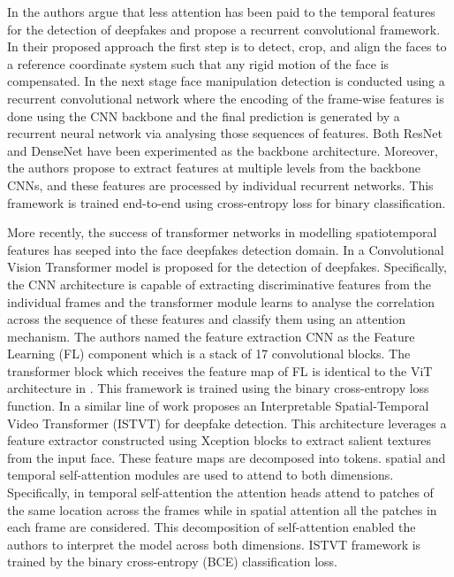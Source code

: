 In \cite{sabir2019recurrent} the authors argue that less attention has been paid to the temporal features for the detection of deepfakes and propose a recurrent convolutional framework. In their proposed approach the first step is to detect, crop, and align the faces to a reference coordinate system such that any rigid motion of the face is compensated. In the next stage face manipulation detection is conducted using a recurrent convolutional network where the encoding of the frame-wise features is done using the CNN backbone and the final prediction is generated by a recurrent neural network via analysing those sequences of features. Both ResNet and DenseNet have been experimented as the backbone architecture. Moreover, the authors propose to extract features at multiple levels from the backbone CNNs, and these features are processed by individual recurrent networks. This framework is trained end-to-end using cross-entropy loss for binary classification. 

More recently, the success of transformer networks in modelling spatiotemporal features has seeped into the face deepfakes detection domain. In \cite{wodajo2021deepfake} a Convolutional Vision Transformer model is proposed for the detection of deepfakes. Specifically, the CNN architecture is capable of extracting discriminative features from the individual frames and the transformer module learns to analyse the correlation across the sequence of these features and classify them
using an attention mechanism. The authors named the feature extraction CNN as the Feature Learning (FL) component which is a stack of 17 convolutional blocks. The transformer block which receives the feature map of FL is identical to the ViT architecture in \cite{dosovitskiy2020image}. This framework is trained using the binary cross-entropy loss function. In a similar line of work \cite{zhao2023istvt} proposes an Interpretable Spatial-Temporal Video Transformer (ISTVT) for deepfake detection. This architecture leverages a feature extractor constructed using Xception blocks to extract salient textures from the input face. These feature maps are decomposed into tokens. spatial and temporal self-attention modules are used to attend to both dimensions. Specifically, in temporal self-attention the attention heads attend to patches of the same location across the frames while in spatial attention all the patches in each frame are considered. This decomposition of self-attention enabled the authors to interpret the model across both dimensions. ISTVT framework is trained by the binary cross-entropy (BCE) classification loss.

